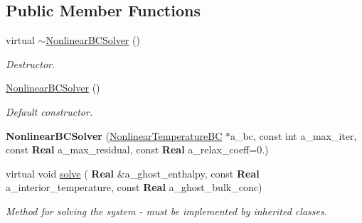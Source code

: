 \subsection*{Public Member Functions}
\begin{DoxyCompactItemize}
\item 
\mbox{\label{class_nonlinear_b_c_solver_a1021520079adc1f89ef622a09f10e7c8}} 
virtual \hyperlink{class_nonlinear_b_c_solver_a1021520079adc1f89ef622a09f10e7c8}{$\sim$\+Nonlinear\+B\+C\+Solver} ()
\begin{DoxyCompactList}\small\item\em Destructor. \end{DoxyCompactList}\item 
\mbox{\label{class_nonlinear_b_c_solver_ad9a4188a7df6af0a6b49aab9281fb621}} 
\hyperlink{class_nonlinear_b_c_solver_ad9a4188a7df6af0a6b49aab9281fb621}{Nonlinear\+B\+C\+Solver} ()
\begin{DoxyCompactList}\small\item\em Default constructor. \end{DoxyCompactList}\item 
\mbox{\label{class_nonlinear_b_c_solver_ab389410dc6d20d2ede859d8c2cd7c0b1}} 
{\bfseries Nonlinear\+B\+C\+Solver} (\hyperlink{class_nonlinear_temperature_b_c}{Nonlinear\+Temperature\+BC} $\ast$a\+\_\+bc, const int a\+\_\+max\+\_\+iter, const \textbf{ Real} a\+\_\+max\+\_\+residual, const \textbf{ Real} a\+\_\+relax\+\_\+coeff=0.)
\item 
\mbox{\label{class_nonlinear_b_c_solver_a57e02843eaace5a1cda2955ee633a930}} 
virtual void \hyperlink{class_nonlinear_b_c_solver_a57e02843eaace5a1cda2955ee633a930}{solve} (\textbf{ Real} \&a\+\_\+ghost\+\_\+enthalpy, const \textbf{ Real} a\+\_\+interior\+\_\+temperature, const \textbf{ Real} a\+\_\+ghost\+\_\+bulk\+\_\+conc)
\begin{DoxyCompactList}\small\item\em Method for solving the system -\/ must be implemented by inherited classes. \end{DoxyCompactList}\end{DoxyCompactItemize}
